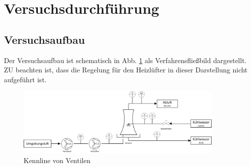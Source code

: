 \section{Versuchsdurchführung}

\subsection{Versuchsaufbau}
Der Versuchsaufbau ist schematisch in Abb. \ref{fig:fliessbild} als Verfahrensfließbild dargestellt. ZU beachten ist, dass die Regelung für den Heizlüfter  in dieser Darstellung nicht aufgeführt ist.

\begin{figure}[h!]
	\centering
	\includegraphics[width=0.9\textwidth]{img/fliessbild}
	\caption{Kennline von Ventilen}
	\label{fig:fliessbild}
\end{figure}
\FloatBarrier
